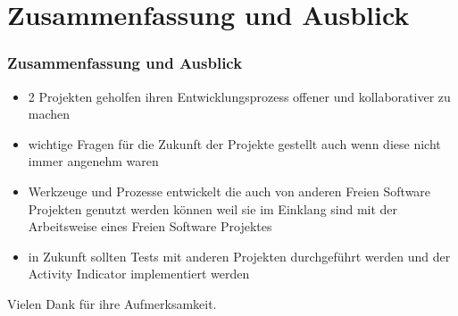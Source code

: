 \documentclass{beamer}
\begin{document}
\section{Zusammenfassung und Ausblick}

\begin{frame}
\frametitle{Zusammenfassung und Ausblick}
\begin{itemize}
 \item 2 Projekten geholfen ihren Entwicklungsprozess offener und kollaborativer zu machen
 \item wichtige Fragen f\"ur die Zukunft der Projekte gestellt auch wenn diese nicht immer angenehm waren
 \item Werkzeuge und Prozesse entwickelt die auch von anderen Freien Software Projekten genutzt werden k\"onnen weil sie im Einklang sind mit der Arbeitsweise eines Freien Software Projektes
 \item in Zukunft sollten Tests mit anderen Projekten durchgeführt werden und der Activity Indicator implementiert werden
\end{itemize}
\end{frame}

\begin{frame}
\begin{center}
 Vielen Dank f\"ur ihre Aufmerksamkeit.
\end{center}
\end{frame}
\end{document}
